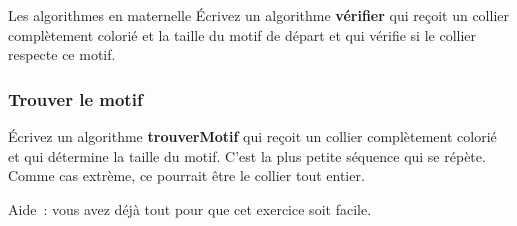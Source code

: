 \begin{Exercice}{Les algorithmes en maternelle}
			Écrivez un algorithme \textbf{vérifier}
			qui reçoit un collier complètement colorié
			et la taille du motif de départ et qui vérifie
			si le collier respecte ce motif.
		
		\subsubsection*{Trouver le motif}
		
			Écrivez un algorithme \textbf{trouverMotif}
			qui reçoit un collier complètement colorié
			et qui détermine la taille du motif.
			C’est la plus petite séquence qui se répète.
			Comme cas extrème, ce pourrait être le collier tout entier.
		
			Aide~: vous avez déjà tout pour que cet exercice soit facile.


		\end{Exercice}
